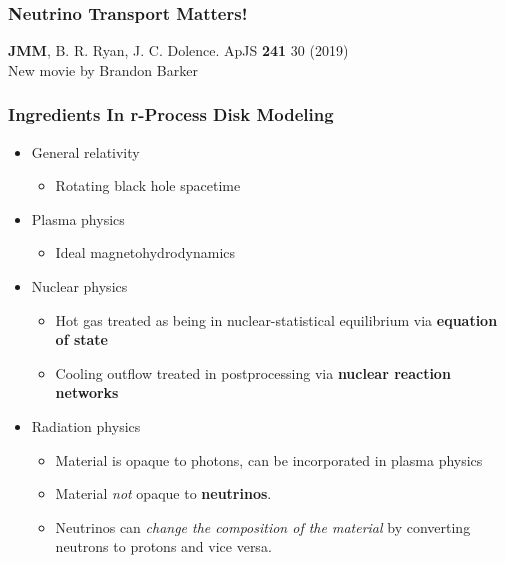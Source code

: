 \documentclass[]{beamer}
\begin{document}
\begin{frame}
  \frametitle{Neutrino Transport Matters!}
  \begin{center}
  \end{center}
  \begin{tiny}
    \textbf{JMM}, B. R. Ryan, J. C. Dolence. ApJS \textbf{241} 30 (2019) \\
    New movie by Brandon Barker
  \end{tiny}
\end{frame}

\begin{frame}
  \frametitle{Ingredients In r-Process Disk Modeling}
  \begin{itemize}
  \item General relativity
    \begin{itemize}
    \item Rotating black hole spacetime
    \end{itemize}
  \item Plasma physics
    \begin{itemize}
    \item Ideal magnetohydrodynamics
    \end{itemize}
  \item Nuclear physics
    \begin{itemize}
    \item Hot gas treated as being in nuclear-statistical equilibrium via \textbf{equation of state}
    \item Cooling outflow treated in postprocessing via \textbf{nuclear reaction networks}
    \end{itemize}
  \item Radiation physics
    \begin{itemize}
    \item Material is opaque to photons, can be incorporated in plasma physics
    \item Material \textit{not} opaque to \textbf{neutrinos}.
    \item Neutrinos can \textit{change the composition of the
        material} by converting neutrons to protons and vice versa.
    \end{itemize}
  \end{itemize}
\end{frame}
\end{document}
